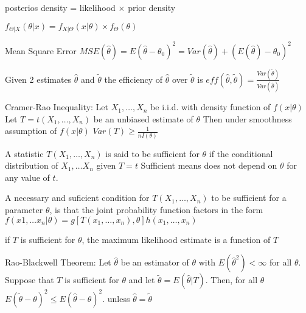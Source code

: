 \documentclass{article}
\begin{document}
\begin{multicols*}{3}
    posterios density = likelihood $\times$ prior density

    $f_{\Theta | X}\left( \theta | x \right) = f_{X|\Theta}\left( x | \theta \right) \times f_\Theta \left( \theta \right)$

    Mean Square Error $MSE\left( \hat{\theta} \right) = E\left( \hat{\theta} - \theta_0 \right)^2 = Var\left( \hat{\theta} \right) + \left( E\left( \hat{\theta}\right) - \theta_0 \right)^2 $

    Given 2 estimates $\hat{\theta}$ and $\tilde{\theta}$ the efficiency of $\hat{\theta}$ over $\tilde{\theta}$ is
    $eff\left( \hat{\theta}, \tilde{\theta}  \right) = \frac{Var \left( \tilde{\theta} \right)}{Var \left( \hat{\theta} \right)}$

    Cramer-Rao Inequality: Let $X_1, \dots, X_n$ be i.i.d. with density function of $f\left( x|\theta \right)$ Let $T=t\left( X_1, \dots, X_n \right)$ be an unbiased estimate of $\theta$ Then under smoothness assumption of $f\left(x|\theta\right)$
    $Var\left( T \right) \geq \frac{1}{n I\left( \theta \right)}$

    A statistic $T(X_1, \dots, X_n)$ is said to be sufficient for $\theta$ if the conditional distribution of $X_1, \dots X_n$ given $T=t$
    Sufficient means does not depend on $\theta$ for any value of $t$.

    A necessary and suficient condition for $T(X_1, \dots, X_n)$ to be sufficient for a parameter $\theta$,
    is that the joint probability function factors in the form $f\left( x1, \dots x_n | \theta \right) =g \left[ T\left( x_1, \dots, x_n \right), \theta \right] h\left( x_1, \dots, x_n \right)$

    if $T$ is sufficient for $\theta$, the maximum likelihood estimate is a function of $T$

    Rao-Blackwell Theorem:
    Let $\hat{\theta}$ be an estimator of $\theta$ with $E\left( \hat{\theta}^2\right) < \infty$ for all $\theta$.
    Suppose that $T$ is sufficient for $\theta$ and let $\tilde{\theta} = E\left( \hat{\theta} |T \right)$.
    Then, for all $\theta$
    $E\left( \tilde{\theta} - \theta \right)^2 \leq E\left( \hat{\theta} - \theta \right)^2$.
    unless $\hat{\theta} = \tilde{\theta}$


\end{multicols*}
\end{document}
